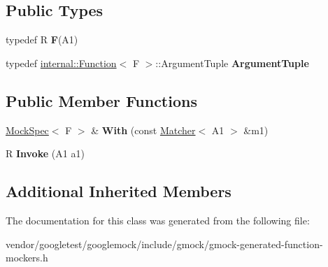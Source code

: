 \subsection*{Public Types}
\begin{DoxyCompactItemize}
\item 
\mbox{\label{classtesting_1_1internal_1_1_function_mocker_3_01_r_07_a1_08_4_ada54286442ab14a18c2308cef748848f}} 
typedef R {\bfseries F}(A1)
\item 
\mbox{\label{classtesting_1_1internal_1_1_function_mocker_3_01_r_07_a1_08_4_aacec6412ac4343c071d7dfe965558b0b}} 
typedef \mbox{\hyperlink{structtesting_1_1internal_1_1_function}{internal\+::\+Function}}$<$ F $>$\+::Argument\+Tuple {\bfseries Argument\+Tuple}
\end{DoxyCompactItemize}
\subsection*{Public Member Functions}
\begin{DoxyCompactItemize}
\item 
\mbox{\label{classtesting_1_1internal_1_1_function_mocker_3_01_r_07_a1_08_4_aa61b5c24c52b8c49713774c49a01b26e}} 
\mbox{\hyperlink{classtesting_1_1internal_1_1_mock_spec}{Mock\+Spec}}$<$ F $>$ \& {\bfseries With} (const \mbox{\hyperlink{classtesting_1_1_matcher}{Matcher}}$<$ A1 $>$ \&m1)
\item 
\mbox{\label{classtesting_1_1internal_1_1_function_mocker_3_01_r_07_a1_08_4_a4a58d37902572c8136d999c5008dce1a}} 
R {\bfseries Invoke} (A1 a1)
\end{DoxyCompactItemize}
\subsection*{Additional Inherited Members}


The documentation for this class was generated from the following file\+:\begin{DoxyCompactItemize}
\item 
vendor/googletest/googlemock/include/gmock/gmock-\/generated-\/function-\/mockers.\+h\end{DoxyCompactItemize}
